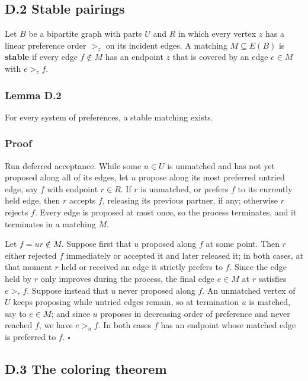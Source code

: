 \documentclass[
  11pt,
]{article}
\begin{document}
\subsection{D.2 Stable pairings}\label{d.2-stable-pairings}

Let \(B\) be a bipartite graph with parts \(U\) and \(R\) in which every
vertex \(z\) has a linear preference order \(>_z\) on its incident
edges. A matching \(M\subseteq E(B)\) is \textbf{stable} if every edge
\(f\notin M\) has an endpoint \(z\) that is covered by an edge
\(e\in M\) with \(e>_zf\).

\subsubsection{Lemma D.2}\label{lemma-d.2-galeshapley-13}

For every system of preferences, a stable matching exists.

\subsubsection{Proof}\label{proof-8}

Run deferred acceptance. While some \(u\in U\) is unmatched and has not
yet proposed along all of its edges, let \(u\) propose along its most
preferred untried edge, say \(f\) with endpoint \(r\in R\). If \(r\) is
unmatched, or prefers \(f\) to its currently held edge, then \(r\)
accepts \(f\), releasing its previous partner, if any; otherwise \(r\)
rejects \(f\). Every edge is proposed at most once, so the process
terminates, and it terminates in a matching \(M\).

Let \(f=ur\notin M\). Suppose first that \(u\) proposed along \(f\) at
some point. Then \(r\) either rejected \(f\) immediately or accepted it
and later released it; in both cases, at that moment \(r\) held or
received an edge it strictly prefers to \(f\). Since the edge held by
\(r\) only improves during the process, the final edge \(e\in M\) at
\(r\) satisfies \(e>_rf\). Suppose instead that \(u\) never proposed
along \(f\). An unmatched vertex of \(U\) keeps proposing while untried
edges remain, so at termination \(u\) is matched, say to \(e\in M\); and
since \(u\) proposes in decreasing order of preference and never reached
\(f\), we have \(e>_uf\). In both cases \(f\) has an endpoint whose
matched edge is preferred to \(f\). \(\square\)

\subsection{D.3 The coloring theorem}\label{d.3-the-coloring-theorem}
\end{document}
